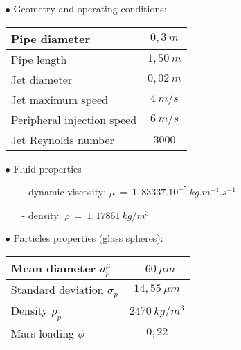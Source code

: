 \documentclass[a4paper,twoside,12pt]{article}
\begin{document}
\begin{itemize}

   \item[$\bullet$] Geometry and operating conditions:

         \begin{table}[!bth]
            \begin{center}
               \begin{tabular}{|l|c|} \hline
                  Pipe diameter              & $0,3~m $ \\ \hline
                  Pipe length                & $1,50~m$ \\ \hline
                  Jet diameter               & $0,02~m$ \\ \hline
                  Jet maximum speed          & $4 ~m/s$ \\ \hline
                  Peripheral injection speed & $6 ~m/s$ \\ \hline
                  Jet Reynolds number        & $3000$   \\ \hline
               \end{tabular}
            \end{center}
         \end{table}

   \item[$\bullet$] Fluid properties

         \begin{itemize}
            \item[-] dynamic viscosity: $\mu~=~1,83337.10^{-5}~kg.m^{-1}.s^{-1}$
            \item[-] density: $\rho~=~1,17861~kg/m^3$
         \end{itemize}
         \vspace{5mm}

   \item[$\bullet$] Particles properties (glass spheres):

         \begin{table}[!bth]
            \begin{center}
               \begin{tabular}{|l|c|} \hline
                  Mean diameter $d_p^{\mu}$       & \  $60~ \mu m$   \\ \hline
                  Standard deviation $\sigma_{p}$ & $14,55 ~\mu m$   \\ \hline
                  Density $\rho_{p}$              & $2470 ~kg/m^{3}$ \\ \hline
                  Mass loading $\phi$             & $0,22$           \\ \hline
               \end{tabular}
            \end{center}
         \end{table}


\end{itemize}
\end{document}
